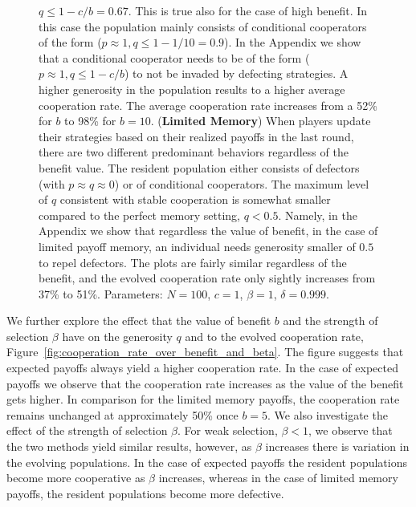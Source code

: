 \documentclass[11pt]{article}
\theoremstyle{plainCl1}
\theoremstyle{plainCl2}
\begin{document}
\begin{figure}[!htbp]
{    $q\!\le\!1\!-\!c/b\!=\!0.67$. This is true also for the case of high benefit.
    In this case the population mainly consists of conditional
    cooperators of the form ($p\!\approx\!1\!, q\!\le\!1\!-\!1/10\!=\!0.9$).
    In the Appendix we show that a conditional cooperator needs to be
    of the form ($p\!\approx\!1\!, q\!\le\!1\!-\!c/b$) to not be invaded by
    defecting strategies. A higher generosity in the population results to a
    higher average cooperation rate. The average cooperation rate
    increases from a 52\% for \(b\) to 98\% for \(b=10\).
    ({\bf Limited Memory}) When players
    update their strategies based on their realized payoffs in the last round,
    there are two different predominant behaviors regardless of the benefit value. The resident population
    either consists of defectors (with $p\!\approx\!q\!\approx\!0$) or of
    conditional cooperators. The maximum level of $q$
    consistent with stable cooperation is somewhat smaller compared to the
    perfect memory setting, $q\!<\!0.5$. Namely, in the Appendix we show
    that regardless the value of benefit, in the case of limited payoff memory,
    an individual needs generosity smaller of $0.5$
    to repel defectors. The plots
    are fairly similar regardless of the benefit, and the evolved cooperation
    rate only sightly increases from 37\% to 51\%. Parameters: $N\!=\!100$, $c\!=\!1$, $\beta\!=\!1$,
    $\delta\!=\!0.999$.}
    \label{fig:expected_and_stochastic_for_donation}
\end{figure}

We further explore the effect that the value of benefit \(b\) and the strength
of selection \(\beta\) have on the generosity \(q\) and to the evolved
cooperation rate, Figure~\ref{fig:cooperation_rate_over_benefit_and_beta}. The
figure suggests that expected payoffs always yield a higher cooperation rate. In
the case of expected payoffs we observe that the cooperation rate increases as
the value of the benefit gets higher. In comparison for the limited memory
payoffs, the cooperation rate remains unchanged at approximately 50\% once
\(b=5\). We also investigate the effect of the strength of selection $\beta$.
For weak selection, \(\beta < 1\), we observe that the two methods yield similar
results, however, as \(\beta\) increases there is variation in the evolving
populations. In the case of expected payoffs the resident populations become
more cooperative as \(\beta\) increases, whereas in the case of limited memory
payoffs, the resident populations become more defective.
\end{document}
